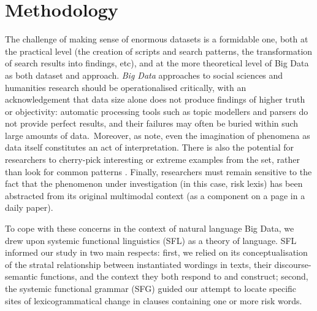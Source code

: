 
\chapter{Methodology}
	
	The challenge of making sense of enormous datasets is a formidable one, both at the practical level (the creation of scripts and search patterns, the transformation of search results into findings, etc), and at the more theoretical level of Big Data as both dataset and approach. \emph{Big Data} approaches to social sciences and humanities research should be operationalised critically, with an acknowledgement that data size alone does not produce findings of higher truth or objectivity: automatic processing tools such as topic modellers and parsers do not provide perfect results, and their failures may often be buried within such large amounts of data.~Moreover, as  note, even the imagination of phenomena as data itself constitutes an act of interpretation. There is also the potential for researchers to cherry-pick interesting or extreme examples from the set, rather than look for common patterns \cite{mautner_time_2005}. Finally, researchers must remain sensitive to the fact that the phenomenon under investigation (in this case, risk lexis) has been abstracted from its original multimodal context (as a component on a page in a daily paper).


	To cope with these concerns in the context of natural language Big Data, we drew upon systemic functional linguistics (SFL) as a theory of language. SFL informed our study in two main respects: first, we relied on its conceptualisation of the stratal relationship between instantiated wordings in texts, their discourse-semantic functions, and the context they both respond to and construct; second, the systemic functional grammar (SFG) guided our attempt to locate specific sites of lexicogrammatical change in clauses containing one or more risk words.

